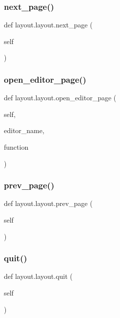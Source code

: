 \subsubsection{\texorpdfstring{next\+\_\+page()}{next\_page()}}
{\footnotesize\ttfamily def layout.\+layout.\+next\+\_\+page (\begin{DoxyParamCaption}\item[{}]{self }\end{DoxyParamCaption})}

\mbox{\label{classlayout_1_1layout_adfea7db87304e6bae605e923ce55c92f}} 
\subsubsection{\texorpdfstring{open\+\_\+editor\+\_\+page()}{open\_editor\_page()}}
{\footnotesize\ttfamily def layout.\+layout.\+open\+\_\+editor\+\_\+page (\begin{DoxyParamCaption}\item[{}]{self,  }\item[{}]{editor\+\_\+name,  }\item[{}]{function }\end{DoxyParamCaption})}

\mbox{\label{classlayout_1_1layout_a2a84004ae84bcf89e33faf6fb9fd5ddc}} 
\subsubsection{\texorpdfstring{prev\+\_\+page()}{prev\_page()}}
{\footnotesize\ttfamily def layout.\+layout.\+prev\+\_\+page (\begin{DoxyParamCaption}\item[{}]{self }\end{DoxyParamCaption})}

\mbox{\label{classlayout_1_1layout_a919675f9c2c0b6dd9c1bd3e1310a2ab3}} 
\subsubsection{\texorpdfstring{quit()}{quit()}}
{\footnotesize\ttfamily def layout.\+layout.\+quit (\begin{DoxyParamCaption}\item[{}]{self }\end{DoxyParamCaption})}

